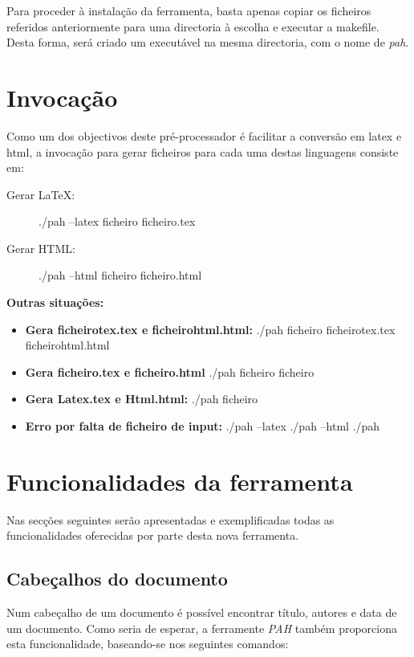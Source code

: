 \documentclass[11pt,a4paper]{article}
\begin{document}
Para proceder à instalação da ferramenta, basta apenas copiar os ficheiros referidos anteriormente para uma directoria à escolha e executar a makefile. Desta forma, será criado um executável na mesma directoria, com o nome de \textit{pah}.


\section{Invocação}
Como um dos objectivos deste pré-processador é facilitar a conversão em latex e html, a invocação para gerar ficheiros para cada uma destas linguagens consiste em: 

\begin{description}
    \item[Gerar LaTeX:] ./pah --latex ficheiro ficheiro.tex
    \item[Gerar HTML:] ./pah --html ficheiro ficheiro.html
\end{description}


\textbf{Outras situações:}
\begin{itemize}
    \item \textbf{Gera ficheirotex.tex e ficheirohtml.html:} 
    ./pah ficheiro ficheirotex.tex ficheirohtml.html
    \item \textbf{Gera ficheiro.tex e ficheiro.html} 
    ./pah ficheiro ficheiro
    \item \textbf{Gera Latex.tex e Html.html:}
    ./pah ficheiro
    \item \textbf{Erro por falta de ficheiro de input:}
    ./pah --latex
    ./pah --html
    ./pah
\end{itemize}


 \newpage 

\section{Funcionalidades da ferramenta}
Nas secções seguintes serão apresentadas e exemplificadas todas as funcionalidades oferecidas por parte desta nova ferramenta. 
 

\subsection{Cabeçalhos do documento}
Num cabeçalho de um documento é possível encontrar título, autores e data de um documento. Como seria de esperar, a ferramente \textit{PAH} também proporciona esta funcionalidade, baseando-se nos seguintes comandos:
\end{document}
